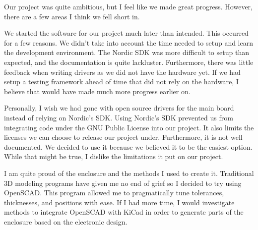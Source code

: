 Our project was quite ambitious, but I feel like we made great progress.
However, there are a few areas I think we fell short in.

We started the software for our project much later than intended.  This
occurred for a few reasons.  We didn't take into account the time needed to
setup and learn the development environment.  The Nordic SDK was more difficult
to setup than expected, and the documentation is quite lackluster.
Furthermore, there was little feedback when writing drivers as we did not have
the hardware yet.  If we had setup a testing framework ahead of time that did
not rely on the hardware, I believe that would have made much more progress
earlier on.

Personally, I wish we had gone with open source drivers for the main board
instead of relying on Nordic's SDK.  Using Nordic's SDK prevented us from
integrating code under the GNU Public License into our project.  It also limits
the licenses we can choose to release our project under.  Furthermore, it is
not well documented.  We decided to use it because we believed it to be the
easiest option.  While that might be true, I dislike the limitations it put on
our project.

I am quite proud of the enclosure and the methods I used to create it.
Traditional 3D modeling programs have given me no end of grief so I decided to
try using OpenSCAD.  This program allowed me to pragmatically tune tolerances,
thicknesses, and positions with ease.  If I had more time, I would investigate
methods to integrate OpenSCAD with KiCad in order to generate parts of the
enclosure based on the electronic design.

